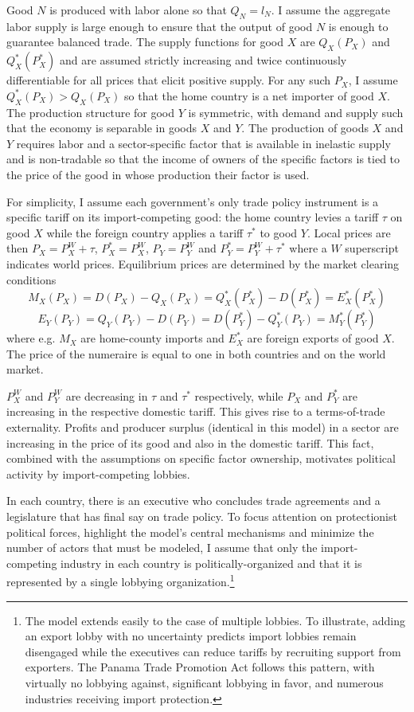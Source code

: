 \documentclass[10pt]{article}
\begin{document}
Good $N$ is produced with labor alone so that $Q_N = l_N$. I assume the aggregate labor supply is large enough to ensure that the output of good $N$ is enough to guarantee balanced trade. The supply functions for good $X$ are $Q_X(P_X)$ and $Q_X^*(P_X^*)$ and are assumed strictly increasing and twice continuously differentiable for all prices that elicit positive supply. For any such $P_X$, I assume $Q_X^*(P_X) > Q_X(P_X)$ so that the home country is a net importer of good $X$. The production structure for good $Y$ is symmetric, with demand and supply such that the economy is separable in goods $X$ and $Y$. The production of goods $X$ and $Y$ requires labor and a sector-specific factor that is available in inelastic supply and is non-tradable so that the income of owners of the specific factors is tied to the price of the good in whose production their factor is used. 

For simplicity, I assume each government's only trade policy instrument is a specific tariff on its import-competing good: the home country levies a tariff $\tau$ on good $X$ while the foreign country applies a tariff $\tau^*$ to good $Y$. Local prices are then $P_X = P_X^W + \tau$, $P_X^* = P_X^W$, $P_Y = P_Y^W$ and $P_Y^* = P_Y^W + \tau^*$ where a $W$ superscript indicates world prices. Equilibrium prices are determined by the market clearing conditions
$$M_X(P_X)= D(P_X)-Q_X(P_X) = Q_X^*(P_X^*) - D(P_X^*) = E_X^*(P_X^*)$$
$$E_Y(P_Y)=Q_Y(P_Y)-D(P_Y) = D(P_Y^*)-Q_Y^*(P_Y) = M_Y^*(P_Y^*)$$
where e.g. $M_X$ are home-county imports and $E_X^*$ are foreign exports of good $X$. The price of the numeraire is equal to one in both countries and on the world market.

$P_X^W$ and $P_Y^W$ are decreasing in $\tau$ and $\tau^*$ respectively, while $P_X$ and $P_Y^*$ are increasing in the respective domestic tariff. This gives rise to a terms-of-trade externality. Profits and producer surplus (identical in this model) in a sector are increasing in the price of its good and also in the domestic tariff. This fact, combined with the assumptions on specific factor ownership, motivates political activity by import-competing lobbies.

In each country, there is an executive who concludes trade agreements and a legislature that has final say on trade policy. To focus attention on protectionist political forces, highlight the model's central mechanisms and minimize the number of actors that must be modeled, I assume that only the import-competing industry in each country is politically-organized and that it is represented by a single lobbying organization.\footnote{The model extends easily to the case of multiple lobbies. To illustrate, adding an export lobby with no uncertainty predicts import lobbies remain disengaged while the executives can reduce tariffs by recruiting support from exporters. The Panama Trade Promotion Act follows this pattern, with virtually no lobbying against, significant lobbying in favor, and numerous industries receiving import protection.\label{fn:lobby}} 
\end{document}

